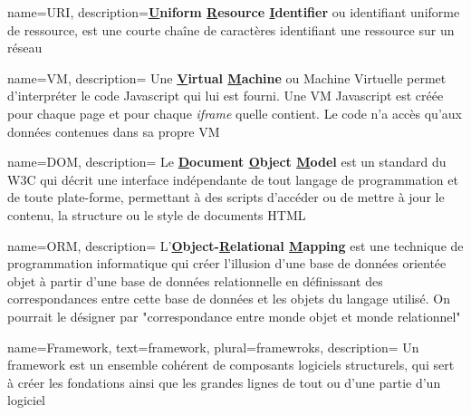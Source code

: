 {
    name=URI,
    description={\textbf{\underline{U}niform \underline{R}esource \underline{I}dentifier} ou identifiant uniforme de ressource, est une courte chaîne de caractères identifiant une ressource sur un réseau}
}

{
    name=VM,
    description=
    {
        Une \textbf{\underline{V}irtual \underline{M}achine} ou Machine Virtuelle permet d'interpréter le code Javascript qui lui est fourni. Une VM Javascript est créée pour chaque page et pour chaque \textit{iframe} quelle contient. Le code n'a accès qu'aux données contenues dans sa propre VM
    }
}

{
    name=DOM,
    description=
    {
        Le \textbf{\underline{D}ocument \underline{O}bject \underline{M}odel} est un standard du W3C qui décrit une interface indépendante de tout langage de programmation et de toute plate-forme, permettant à des scripts d'accéder ou de mettre à jour le contenu, la structure ou le style de documents HTML
    }
}

{
    name=ORM,
    description=
    {
        L'\textbf{\underline{O}bject-\underline{R}elational \underline{M}apping} est une technique de programmation informatique qui créer l'illusion d'une base de données orientée objet à partir d'une base de données relationnelle en définissant des correspondances entre cette base de données et les objets du langage utilisé. On pourrait le désigner par "correspondance entre monde objet et monde relationnel"
    }
}

{
    name=Framework,
    text=framework,
    plural=framewroks,
    description=
    {
        Un framework est un ensemble cohérent de composants logiciels structurels, qui sert à créer les fondations ainsi que les grandes lignes de tout ou d’une partie d'un logiciel
    }
}
